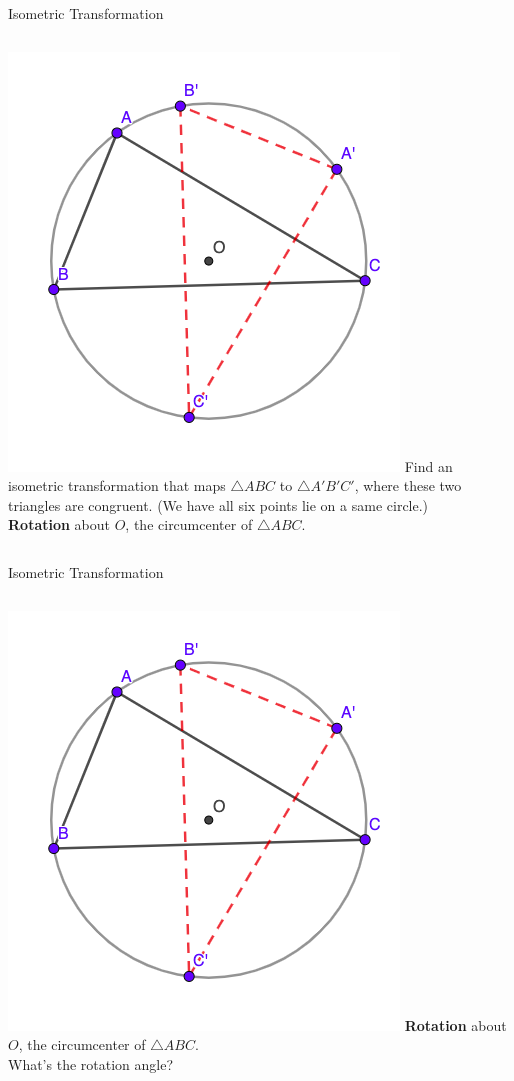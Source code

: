 \documentclass{beamer}
\begin{document}
\begin{frame}{Isometric Transformation}
	\begin{columns}
		\includegraphics[scale=0.4]{iso7.png}
		Find an isometric transformation that maps $\triangle
		ABC$ to $\triangle A'B'C'$, where these two triangles
		are congruent. (We have all six points lie on a same
		circle.)\\
		\phantom{Spacing}
		\textbf{Rotation} about $O$, the circumcenter of 
		$\triangle ABC$.
	\end{columns}
\end{frame}
\begin{frame}{Isometric Transformation}
	\begin{columns}
		\column{0.6\textwidth}
		\includegraphics[scale=0.4]{iso7.png}
		\column{0.4\textwidth}
		\textbf{Rotation} about $O$, the circumcenter of 
		$\triangle ABC$.\\
		\phantom{Spacing}
		What's the rotation angle?
	\end{columns}
\end{frame}
\end{document}
